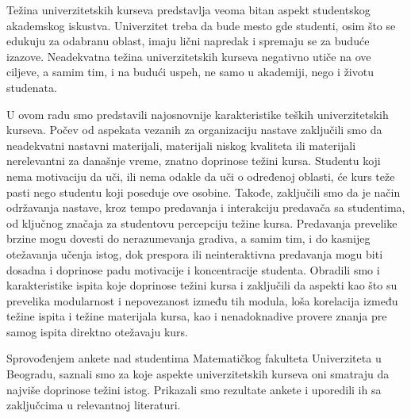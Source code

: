 \documentclass[a4paper]{article}
\begin{document}
Težina univerzitetskih kurseva predstavlja veoma bitan aspekt studentskog akademskog iskustva. Univerzitet treba da bude mesto gde studenti, osim što se edukuju za odabranu oblast, imaju lični napredak i spremaju se za buduće izazove. Neadekvatna težina univerzitetskih kurseva negativno utiče na ove ciljeve, a samim tim, i na budući uspeh, ne samo u akademiji, nego i životu studenata. 

U ovom radu smo predstavili najosnovnije karakteristike teških univerzitetskih kurseva. Počev od aspekata vezanih za organizaciju nastave zaključili smo da neadekvatni nastavni materijali, materijali niskog kvaliteta ili materijali nerelevantni za današnje vreme, znatno doprinose težini kursa. Studentu koji nema motivaciju da uči, ili nema odakle da uči o određenoj oblasti, će kurs teže pasti nego studentu koji poseduje ove osobine. Takođe, zaključili smo da je način održavanja nastave, kroz tempo predavanja i interakciju predavača sa studentima, od ključnog značaja za studentovu percepciju težine kursa. Predavanja prevelike brzine mogu dovesti do nerazumevanja gradiva, a samim tim, i do kasnijeg otežavanja učenja istog, dok prespora ili neinteraktivna predavanja mogu biti dosadna i doprinose padu motivacije i koncentracije studenta. Obradili smo i karakteristike ispita koje doprinose težini kursa i zaključili da aspekti kao što su prevelika modularnost i nepovezanost između tih modula, loša korelacija između težine ispita i težine materijala kursa, kao i nenadoknadive provere znanja pre samog ispita direktno otežavaju kurs.

Sprovođenjem ankete nad studentima Matematičkog fakulteta Univerziteta u Beogradu, saznali smo za koje aspekte univerzitetskih kurseva oni smatraju da najviše doprinose težini istog. Prikazali smo rezultate ankete i uporedili ih sa zaključcima u relevantnoj literaturi.

\newpage

\appendix
 

\end{document}

